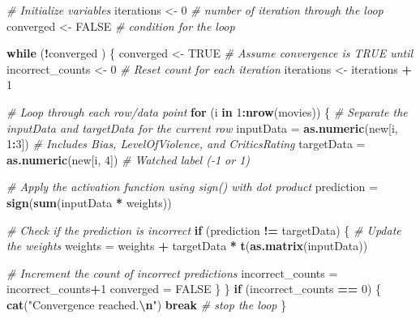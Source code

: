 \documentclass[
]{article}
\newenvironment{Shaded}{\begin{snugshade}}{\end{snugshade}}
\newcommand{\CommentTok}[1]{\textcolor[rgb]{0.56,0.35,0.01}{\textit{#1}}}
\newcommand{\ConstantTok}[1]{\textcolor[rgb]{0.56,0.35,0.01}{#1}}
\newcommand{\ControlFlowTok}[1]{\textcolor[rgb]{0.13,0.29,0.53}{\textbf{#1}}}
\newcommand{\DecValTok}[1]{\textcolor[rgb]{0.00,0.00,0.81}{#1}}
\newcommand{\FunctionTok}[1]{\textcolor[rgb]{0.13,0.29,0.53}{\textbf{#1}}}
\newcommand{\NormalTok}[1]{#1}
\newcommand{\OtherTok}[1]{\textcolor[rgb]{0.56,0.35,0.01}{#1}}
\newcommand{\SpecialCharTok}[1]{\textcolor[rgb]{0.81,0.36,0.00}{\textbf{#1}}}
\newcommand{\StringTok}[1]{\textcolor[rgb]{0.31,0.60,0.02}{#1}}
\begin{document}
\begin{Shaded}
\begin{Highlighting}[]
\CommentTok{\# Initialize variables}
\NormalTok{iterations }\OtherTok{\textless{}{-}} \DecValTok{0} \CommentTok{\# number of iteration through the loop}
\NormalTok{converged }\OtherTok{\textless{}{-}} \ConstantTok{FALSE} \CommentTok{\# condition for the loop}


\ControlFlowTok{while}\NormalTok{ (}\SpecialCharTok{!}\NormalTok{converged ) }
\NormalTok{  \{}
\NormalTok{  converged }\OtherTok{\textless{}{-}} \ConstantTok{TRUE}  \CommentTok{\# Assume convergence is TRUE until}
\NormalTok{  incorrect\_counts }\OtherTok{\textless{}{-}} \DecValTok{0}  \CommentTok{\# Reset count for each iteration}
\NormalTok{  iterations }\OtherTok{\textless{}{-}}\NormalTok{ iterations }\SpecialCharTok{+} \DecValTok{1}
  
  \CommentTok{\# Loop through each row/data point}
  \ControlFlowTok{for}\NormalTok{ (i }\ControlFlowTok{in} \DecValTok{1}\SpecialCharTok{:}\FunctionTok{nrow}\NormalTok{(movies)) \{}
    \CommentTok{\# Separate the inputData and targetData for the current row}
\NormalTok{    inputData }\OtherTok{=} \FunctionTok{as.numeric}\NormalTok{(new[i, }\DecValTok{1}\SpecialCharTok{:}\DecValTok{3}\NormalTok{])  }\CommentTok{\# Includes Bias, LevelOfViolence, and CriticsRating}
\NormalTok{    targetData }\OtherTok{=} \FunctionTok{as.numeric}\NormalTok{(new[i, }\DecValTok{4}\NormalTok{])   }\CommentTok{\# Watched label ({-}1 or 1)}
    
    \CommentTok{\# Apply the activation function using sign() with dot product}
\NormalTok{    prediction }\OtherTok{=} \FunctionTok{sign}\NormalTok{(}\FunctionTok{sum}\NormalTok{(inputData }\SpecialCharTok{*}\NormalTok{ weights))}
    
    \CommentTok{\# Check if the prediction is incorrect}
    \ControlFlowTok{if}\NormalTok{ (prediction }\SpecialCharTok{!=}\NormalTok{ targetData) \{}
      \CommentTok{\# Update the weights}
\NormalTok{      weights }\OtherTok{=}\NormalTok{ weights }\SpecialCharTok{+}\NormalTok{ targetData }\SpecialCharTok{*} \FunctionTok{t}\NormalTok{(}\FunctionTok{as.matrix}\NormalTok{(inputData))}
      
      \CommentTok{\# Increment the count of incorrect predictions}
\NormalTok{      incorrect\_counts }\OtherTok{=}\NormalTok{ incorrect\_counts}\SpecialCharTok{+}\DecValTok{1}
\NormalTok{      converged }\OtherTok{=} \ConstantTok{FALSE} 
\NormalTok{    \}}
\NormalTok{  \}}
  \ControlFlowTok{if}\NormalTok{ (incorrect\_counts }\SpecialCharTok{==} \DecValTok{0}\NormalTok{) \{}
    \FunctionTok{cat}\NormalTok{(}\StringTok{"Convergence reached.}\SpecialCharTok{\textbackslash{}n}\StringTok{"}\NormalTok{)}
    \ControlFlowTok{break} \CommentTok{\# stop the loop}
\NormalTok{  \}}
  

\end{Highlighting}
\end{Shaded}
\end{document}
